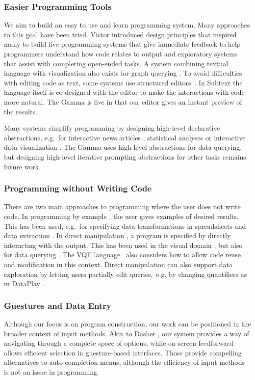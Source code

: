 \documentclass[manuscript,review,anonymous]{acmart}
\begin{document}
\subsubsection*{Easier Programming Tools}
We aim to build an easy to use and learn programming system. Many approaches to this
goal have been tried. Victor \cite{principle} introduced design principles that
inspired many to build live programming systems \cite{review,liveroad,lighttable} that give
immediate feedback to help programmers understand how code relates to output and
exploratory systems \cite{variolite,exploratory} that assist with completing open-ended tasks.
A system combining textual language with visualization also exists for graph querying \cite{guess}.
To avoid difficulties with editing code as text, some systems use structured editors~\cite{structure-based,livenut,lamdu}.
In Subtext \cite{subtext,directprog} the language itself is co-designed with the editor to make
the interactions with code more natural. The Gamma is live in that our editor gives an instant
preview of the results.

Many systems simplify programming by designing high-level declarative abstractions,
e.g.~for interactive news articles \cite{idyll}, statistical analyses \cite{tea}
or interactive data visualization \cite{interactionviz,vegalite}. The Gamma uses
high-level abstractions for data querying, but designing high-level iterative prompting
abstractions for other tasks remains future work.

\subsubsection*{Programming without Writing Code}
There are two main approaches to programming where
the user does not write code. In programming by example \cite{byexample}, the user gives
examples of desired results. This has been used, e.g.~for specifying data transformations
in spreadsheets and data extraction \cite{spreadsheetpbe,flashextract}.
In direct manipulation \cite{direct}, a program is specified by directly interacting with the
output. This has been used in the visual domain \cite{sketchnsketch}, but also for data querying
\cite{dynamicq,vlang}. The VQE language~\cite{visage} also considers how to allow code reuse and
modification in this context. Direct manipulation can also support data exploration by letting
users partially edit queries,~e.g. by changing quantifiers as in DataPlay~\cite{dataplay}.

\subsubsection*{Guestures and Data Entry}
Although our focus is on program construction, our work can be positioned in the
broader context of input methods. Akin to Dasher \cite{dasher}, our system provides a way of
navigating through a complete space of options, while on-screen feedforward \cite{octopocus} allows
efficient selection in guesture-based interfaces. Those provide compelling alternatives to
auto-completion menus, although the efficiency of input methods is not an issue in programming.
\end{document}
